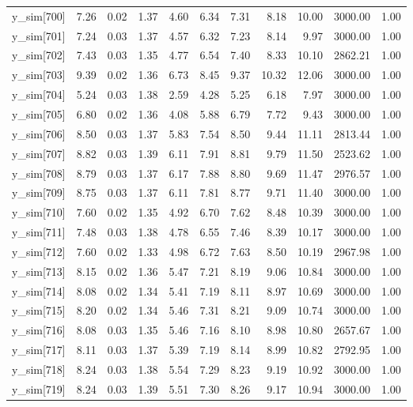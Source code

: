 \begin{table}[ht]
\begin{tabular}{rrrrrrrrrrr}
  y\_sim[700] & 7.26 & 0.02 & 1.37 & 4.60 & 6.34 & 7.31 & 8.18 & 10.00 & 3000.00 & 1.00 \\ 
  y\_sim[701] & 7.24 & 0.03 & 1.37 & 4.57 & 6.32 & 7.23 & 8.14 & 9.97 & 3000.00 & 1.00 \\ 
  y\_sim[702] & 7.43 & 0.03 & 1.35 & 4.77 & 6.54 & 7.40 & 8.33 & 10.10 & 2862.21 & 1.00 \\ 
  y\_sim[703] & 9.39 & 0.02 & 1.36 & 6.73 & 8.45 & 9.37 & 10.32 & 12.06 & 3000.00 & 1.00 \\ 
  y\_sim[704] & 5.24 & 0.03 & 1.38 & 2.59 & 4.28 & 5.25 & 6.18 & 7.97 & 3000.00 & 1.00 \\ 
  y\_sim[705] & 6.80 & 0.02 & 1.36 & 4.08 & 5.88 & 6.79 & 7.72 & 9.43 & 3000.00 & 1.00 \\ 
  y\_sim[706] & 8.50 & 0.03 & 1.37 & 5.83 & 7.54 & 8.50 & 9.44 & 11.11 & 2813.44 & 1.00 \\ 
  y\_sim[707] & 8.82 & 0.03 & 1.39 & 6.11 & 7.91 & 8.81 & 9.79 & 11.50 & 2523.62 & 1.00 \\ 
  y\_sim[708] & 8.79 & 0.03 & 1.37 & 6.17 & 7.88 & 8.80 & 9.69 & 11.47 & 2976.57 & 1.00 \\ 
  y\_sim[709] & 8.75 & 0.03 & 1.37 & 6.11 & 7.81 & 8.77 & 9.71 & 11.40 & 3000.00 & 1.00 \\ 
  y\_sim[710] & 7.60 & 0.02 & 1.35 & 4.92 & 6.70 & 7.62 & 8.48 & 10.39 & 3000.00 & 1.00 \\ 
  y\_sim[711] & 7.48 & 0.03 & 1.38 & 4.78 & 6.55 & 7.46 & 8.39 & 10.17 & 3000.00 & 1.00 \\ 
  y\_sim[712] & 7.60 & 0.02 & 1.33 & 4.98 & 6.72 & 7.63 & 8.50 & 10.19 & 2967.98 & 1.00 \\ 
  y\_sim[713] & 8.15 & 0.02 & 1.36 & 5.47 & 7.21 & 8.19 & 9.06 & 10.84 & 3000.00 & 1.00 \\ 
  y\_sim[714] & 8.08 & 0.02 & 1.34 & 5.41 & 7.19 & 8.11 & 8.97 & 10.69 & 3000.00 & 1.00 \\ 
  y\_sim[715] & 8.20 & 0.02 & 1.34 & 5.46 & 7.31 & 8.21 & 9.09 & 10.74 & 3000.00 & 1.00 \\ 
  y\_sim[716] & 8.08 & 0.03 & 1.35 & 5.46 & 7.16 & 8.10 & 8.98 & 10.80 & 2657.67 & 1.00 \\ 
  y\_sim[717] & 8.11 & 0.03 & 1.37 & 5.39 & 7.19 & 8.14 & 8.99 & 10.82 & 2792.95 & 1.00 \\ 
  y\_sim[718] & 8.24 & 0.03 & 1.38 & 5.54 & 7.29 & 8.23 & 9.19 & 10.92 & 3000.00 & 1.00 \\ 
  y\_sim[719] & 8.24 & 0.03 & 1.39 & 5.51 & 7.30 & 8.26 & 9.17 & 10.94 & 3000.00 & 1.00 \\ 

\end{tabular}
\end{table}
